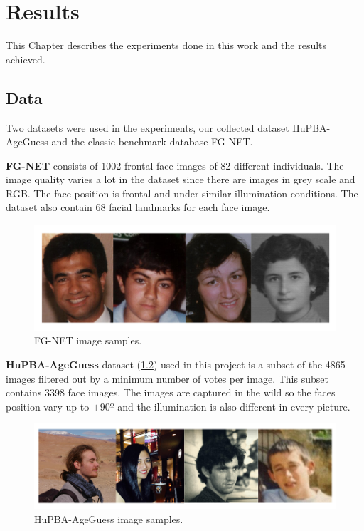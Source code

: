 \chapter{Results} \label{chap:experiments}

This Chapter describes the experiments done in this work and the results achieved.

\section{Data}
Two datasets were used in the experiments, our collected dataset HuPBA-AgeGuess and the classic benchmark database FG-NET.

\textbf{FG-NET} consists of 1002 frontal face images of 82 different individuals. The image quality varies a lot in the dataset since there are images in grey scale and RGB. The face position is frontal and under similar illumination conditions. The dataset also contain 68 facial landmarks for each face image.

\begin{figure}[!h]
	\centering
	\includegraphics[width=\textwidth]{figures/FGNET_sample}
	\caption{FG-NET image samples.}
	\label{fig:imgSample1}
\end{figure}

\textbf{HuPBA-AgeGuess} dataset (\ref{fig:imgSample2}) used in this project is a subset of the 4865 images filtered out by a minimum number of votes per image. This subset contains 3398 face images. The images are captured in the wild so the faces position vary up to $\pm90º$ and the illumination is also different in every picture.

\begin{figure}[!h]
	\centering
	\includegraphics[width=\textwidth]{figures/HuPBA_sample}
	\caption{HuPBA-AgeGuess image samples.}
	\label{fig:imgSample2}
\end{figure}

